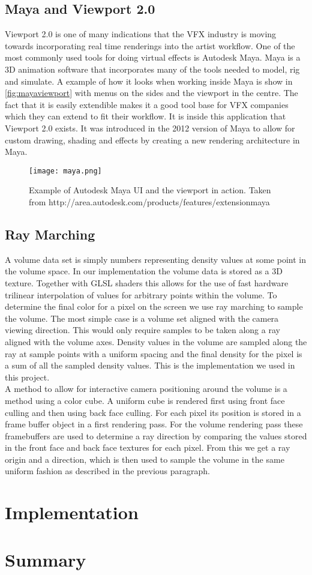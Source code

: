 \documentclass[11pt,twocolumn]{article}
\begin{document}
\subsection{Maya and Viewport 2.0}
Viewport 2.0 is one of many indications that the VFX industry is moving towards incorporating real time renderings into the artist workflow.
One of the most commonly used tools for doing virtual effects is Autodesk Maya.
Maya is a 3D animation software that incorporates many of the tools needed to model, rig and simulate.
A example of how it looks when working inside Maya is show in \autoref{fig:mayaviewport} with menus on the sides and the viewport in the centre.
The fact that it is easily extendible makes it a good tool base for VFX companies which they can extend to fit their workflow.
It is inside this application that Viewport 2.0 exists.
It was introduced in the 2012 version of Maya to allow for custom drawing, shading and effects by creating a new rendering architecture in Maya.

\begin{figure}
\texttt{[image: maya.png]}
\caption{Example of Autodesk Maya UI and the viewport in action. Taken from http://area.autodesk.com/products/features/extensionmaya}
\label{fig:mayaviewport}
\end{figure}

\subsection{Ray Marching}
A volume data set is simply numbers representing density values at some point in the volume space.
In our implementation the volume data is stored as a 3D texture.
Together with GLSL shaders this allows for the use of fast hardware trilinear interpolation of values for arbitrary points within the volume. To determine the final color for a pixel on the screen we use ray marching to sample the volume.
The most simple case is a volume set aligned with the camera viewing direction.
This would only require samples to be taken along a ray aligned with the volume axes.
Density values in the volume are sampled along the ray at sample points with a uniform spacing and the final density for the pixel is a sum of all the sampled density values.
This is the implementation we used in this project.
\\
A method to allow for interactive camera positioning around the volume is a method using a color cube.
A uniform cube is rendered first using front face culling and then using back face culling.
For each pixel its position is stored in a frame buffer object in a first rendering pass.
For the volume rendering pass these framebuffers are used to determine a ray direction by comparing the values stored in the front face and back face textures for each pixel. From this we get a ray origin and a direction, which is then used to sample the volume in the same uniform fashion as described in the previous paragraph.

\section{Implementation}

\section{Summary}


\endgroup
\newpage

\nocite{*}

\end{document}
